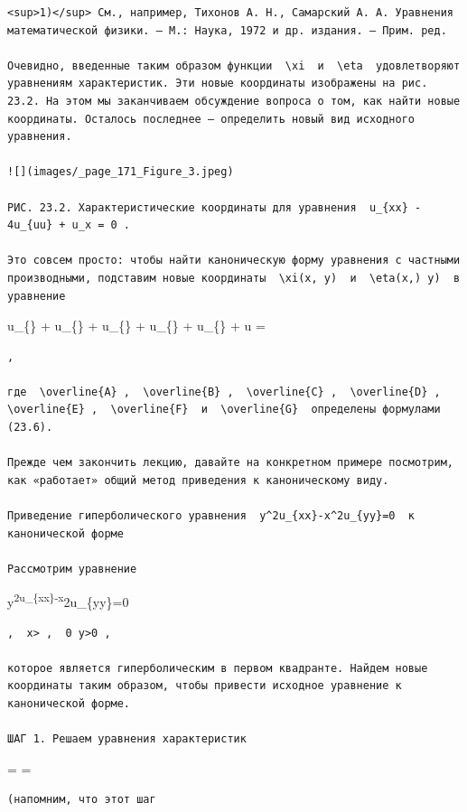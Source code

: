 \documentclass[
  ukrainian,
]{article}
\begin{document}
\begin{verbatim}
<sup>1)</sup> См., например, Тихонов А. Н., Самарский А. А. Уравнения математической физики. — М.: Наука, 1972 и др. издания. — Прим. ред.

Очевидно, введенные таким образом функции  \xi  и  \eta  удовлетворяют уравнениям характеристик. Эти новые координаты изображены на рис. 23.2. На этом мы заканчиваем обсуждение вопроса о том, как найти новые координаты. Осталось последнее — определить новый вид исходного уравнения.

![](images/_page_171_Figure_3.jpeg)

РИС. 23.2. Характеристические координаты для уравнения  u_{xx} - 4u_{uu} + u_x = 0 .

Это совсем просто: чтобы найти каноническую форму уравнения с частными производными, подставим новые координаты  \xi(x, y)  и  \eta(x,) y)  в уравнение
\end{verbatim}

u\_\{\xi\xi\} + u\_\{\xi\eta\} +
u\_\{\eta\eta\} + u\_\{\xi\} +
u\_\{\eta\} + u = 

\begin{verbatim}
,

где  \overline{A} ,  \overline{B} ,  \overline{C} ,  \overline{D} ,  \overline{E} ,  \overline{F}  и  \overline{G}  определены формулами (23.6).

Прежде чем закончить лекцию, давайте на конкретном примере посмотрим, как «работает» общий метод приведения к каноническому виду.

Приведение гиперболического уравнения  y^2u_{xx}-x^2u_{yy}=0  к канонической форме

Рассмотрим уравнение
\end{verbatim}

y\textsuperscript{2u\_\{xx\}-x}2u\_\{yy\}=0

\begin{verbatim}
,  x> ,  0 y>0 ,

которое является гиперболическим в первом квадранте. Найдем новые координаты таким образом, чтобы привести исходное уравнение к канонической форме.

ШАГ 1. Решаем уравнения характеристик
\end{verbatim}

 =  = 

\begin{verbatim}
(напомним, что этот шаг
\end{verbatim}
\end{document}

